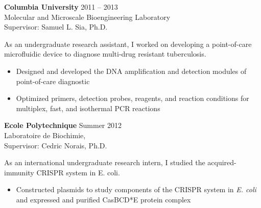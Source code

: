 \documentclass[10pt]{article}
\newenvironment{innerlist}[1][\enskip\textbullet]%
        {\begin{itemize}[#1,leftmargin=*,parsep=0pt,itemsep=0pt,topsep=0pt,partopsep=0pt]}
        {\end{itemize}}
\begin{document}
\vspace{.15in}
\textbf{Columbia University} \hfill {2011 -- 2013} \\
Molecular and Microscale Bioengineering Laboratory \\
Supervisor: Samuel L. Sia, Ph.D. 
	\vspace{0.1in}

As an undergraduate research assistant, I worked on developing a point-of-care microfluidic device to diagnose multi-drug resistant tuberculosis. \\

\begin{innerlist}
\item{Designed and developed the DNA amplification and detection modules of point-of-care diagnostic}
\item{Optimized primers, detection probes, reagents, and reaction conditions for multiplex, fast, and isothermal PCR reactions}
\end{innerlist}

\vspace{.15in}
\textbf{Ecole Polytechnique} \hfill {Summer 2012}\\
Laboratoire de Biochimie,\\
Supervisor: Cedric Norais, Ph.D.
	\vspace{0.1in}

As an international undergraduate research intern, I studied the acquired-immunity CRISPR system in E. coli. \\

\begin{innerlist}
\item{Constructed plasmids to study components of the CRISPR system in \textit{E. coli} and expressed and purified CasBCD*E protein complex}
\end{innerlist}
\end{document}
